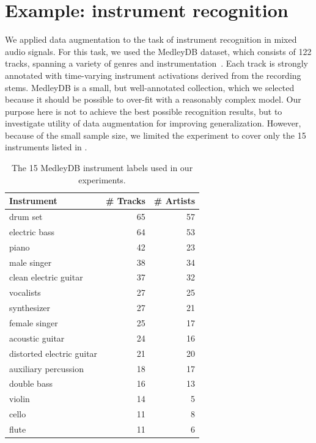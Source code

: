 \documentclass{article}
\begin{document}
\section{Example: instrument recognition}

We applied data augmentation to the task of instrument recognition in mixed audio signals.
For this task, we used the MedleyDB dataset, which consists of 122 tracks, spanning a variety of genres and instrumentation~\cite{bittner2014medleydb}.
Each track is strongly annotated with time-varying instrument activations derived from the recording stems.
MedleyDB is a small, but well-annotated collection, which we selected because
it should be possible to over-fit with a reasonably complex model.
Our purpose here is not to achieve the best possible recognition results, but to
investigate utility of data augmentation for improving generalization.
However, because of the small sample size, we limited the experiment to cover only 
the 15 instruments listed in .


\begin{table}
\caption{The 15 MedleyDB instrument labels used in our experiments.\label{medleytags}}
\centering
\small
    \begin{tabular}{lrr}
        \toprule
        Instrument & \# Tracks & \# Artists\\
        \midrule
        drum set                    & 65 & 57\\
        electric bass               & 64 & 53\\
        piano                       & 42 & 23\\
        male singer                 & 38 & 34\\
        clean electric guitar       & 37 & 32\\
        vocalists                   & 27 & 25\\
        synthesizer                 & 27 & 21\\
        female singer               & 25 & 17\\
        acoustic guitar             & 24 & 16\\
        distorted electric guitar   & 21 & 20 \\
        auxiliary percussion        & 18 & 17\\
        double bass                 & 16 & 13\\
        violin                      & 14 & 5\\
        cello                       & 11 & 8\\
        flute                       & 11 & 6\\
        \bottomrule
    \end{tabular}
\end{table}
\end{document}
